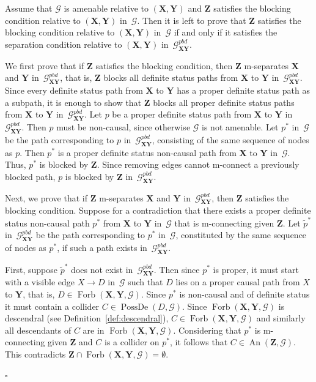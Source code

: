 \documentclass[11pt,a4paper]{article}
\newenvironment{proofof}[1][]{\begin{trivlist}
   \item[\hskip \labelsep {\bfseries Proof of #1.}]}{\hfill{}$\square$\end{trivlist}}
\DeclareMathOperator{\PossDe}{PossDe}
\DeclareMathOperator{\An}{An}
\DeclareMathOperator{\Forbi}{Forb}
\newcommand{\blck}{the blocking condition\xspace}
\newcommand{\condtwoprime}{the separation condition\xspace}
\newcommand{\g}[1][G]{\mathcal{#1}}
\newcommand{\gpbd}[2][G]{\mathcal{#1}_{\mathbf{#2}}^{pbd}}
\newcommand{\fb}[2][X,Y]{\Forbi(\mathbf{#1},#2)}%
\newcommand{\pstar}[1][p]{{#1}^{*}}
\begin{document}
\begin{proofof}[Theorem~\ref{theorem:gac-alt}]
Assume that $\g$ is amenable  relative to $(\mathbf{X,Y})$ and $\mathbf{Z}$ satisfies \blck{} relative to $(\mathbf{X,Y})$ in~$\g$. Then it is left to prove that $\mathbf{Z}$ satisfies \blck relative to $(\mathbf{X,Y})$ in~$\g$ if and only if it satisfies \condtwoprime relative to $(\mathbf{X,Y})$ in~$\gpbd{\mathbf{XY}}$.

We first prove that if $\mathbf{Z}$ satisfies \blck{}, then $\mathbf{Z}$ m-separates $\mathbf{X}$ and $\mathbf{Y}$ in~$\gpbd{\mathbf{XY}}$, that is, $\mathbf{Z}$ blocks all definite status paths from $\mathbf{X}$ to $\mathbf{Y}$ in~$\gpbd{\mathbf{XY}}$. Since every definite status path from $\mathbf{X}$ to $\mathbf{Y}$ has a proper definite status path as a subpath, it is enough to show that $\mathbf{Z}$ blocks all proper definite status paths from $\mathbf{X}$ to $\mathbf{Y}$ in~$\gpbd{\mathbf{XY}}$. Let $p$ be a proper definite status path from $\mathbf{X}$ to $\mathbf{Y}$ in~$\gpbd{\mathbf{XY}}$. Then $p$ must be non-causal, since otherwise $\g$ is not amenable. Let $\pstar$ in~$\g$ be the path corresponding to $p$ in~$\gpbd{\mathbf{XY}}$, consisting of the same sequence of nodes as $p$. Then $\pstar$ is a proper definite status non-causal path from $\mathbf{X}$ to $\mathbf{Y}$ in~$\g$. Thus, $\pstar$ is blocked by $\mathbf{Z}$. Since removing edges cannot m-connect a previously blocked path, $p$ is blocked by $\mathbf{Z}$ in~$\gpbd{\mathbf{XY}}$.

Next, we prove that if $\mathbf{Z}$ m-separates $\mathbf{X}$ and $\mathbf{Y}$ in~$\gpbd{\mathbf{XY}}$, then $\mathbf{Z}$ satisfies \blck{}.
Suppose for a contradiction that there exists a proper definite status non-causal path $\pstar$ from $\mathbf{X}$ to $\mathbf{Y}$ in~$\g$ that is m-connecting given $\mathbf{Z}$. Let $\tilde{p}^*$ in~$\gpbd{\mathbf{XY}}$ be the path corresponding to $\pstar$ in~$\g$, constituted by the same sequence of nodes as $\pstar$, if such a path exists in~$\gpbd{\mathbf{XY}}$.

First, suppose $\tilde{p}^*$ does not exist in~$\gpbd{\mathbf{XY}}$. Then since $\pstar$ is proper, it must start with a visible edge $X \rightarrow D$ in~$\g$ such that $D$ lies on a proper causal path from $X$ to $\mathbf{Y}$, that is, $D \in \fb{\g}$. Since $\pstar$ is non-causal and of definite status it must contain a collider $C \in \PossDe(D,\g)$. Since $\fb{\g}$ is descendral (see Definition~\ref{def:descendral}), $C \in \fb{\g}$ and similarly all descendants of $C$ are in $\fb{\g}$. Considering that $\pstar$ is m-connecting given $\mathbf{Z}$ and $C$ is a collider on $\pstar$, it follows that $C \in \An(\mathbf{Z},\g)$. This contradicts $\mathbf{Z} \cap \fb{\g} = \emptyset$.


\end{proofof}
\end{document}

